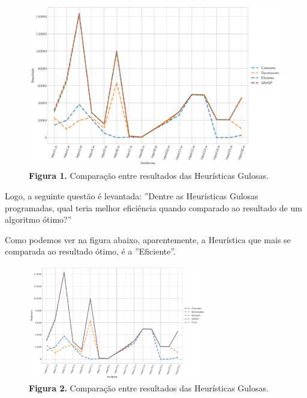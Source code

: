 \documentclass[a4paper, 12pt]{article}
\begin{document}
\begin{figure}[h]
    \centering
    \includegraphics[width=1\linewidth]{../imgs/heuristics_compare.pdf}
    \caption{\textbf{Figura 1.} Comparação entre resultados das Heurísticas Gulosas.}
    \label{greedy_compare}
\end{figure}

Logo, a seguinte questão é levantada: ''Dentre as Heurísticas Gulosas programadas, qual teria melhor eficiência quando comparado ao resultado de um algoritmo ótimo?''

Como podemos ver na figura abaixo, aparentemente, a Heurística que mais se comparada ao resultado ótimo, é a ''Eficiente''.
\begin{figure}[h]
    \centering
    \includegraphics[width=0.7\textwidth]{../imgs/exact_compare.pdf}
    \caption{\textbf{Figura 2.} Comparação entre resultados das Heurísticas Gulosas.}
    \label{exact_compare}
\end{figure}
\end{document}
